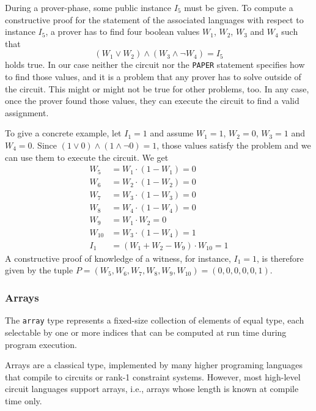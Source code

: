 \begin{example}
During a prover-phase, some public instance $I_5$ must be given. To compute a constructive proof for the statement of the associated languages with respect to instance $I_5$, a prover has to find four boolean values $W_1$, $W_2$, $W_3$ and $W_4$ such that 
$$
\left( W_1 \vee W_2 \right) \wedge (W_3 \wedge \lnot W_4) = I_5
$$ 
holds true. In our case neither the circuit nor the \texttt{PAPER} statement specifies how to find those values, and it is a problem that any prover has to solve outside of the circuit. This might or might not be true for other problems, too. In any case, once the prover found those values, they can execute the circuit to find a valid assignment. 

To give a concrete example, let $I_1=1$ and assume $W_1=1$, $W_2=0$, $W_3=1$ and $W_4=0$. Since 
$\left( 1 \vee 0 \right) \wedge (1 \wedge \lnot 0) = 1$, those values satisfy the problem and we can use them to execute the circuit. We get 
\begin{align*}
W_5 & = W_1 \cdot (1- W_1) = 0\\
W_6 & = W_2 \cdot (1- W_2) = 0 \\
W_7 & = W_3 \cdot (1- W_3) = 0 \\
W_8 & = W_4 \cdot (1- W_4) = 0 \\
W_9 & = W_1\cdot W_2 = 0\\
W_{10} & = W_3 \cdot (1-W_4) = 1\\
I_1 & = (W_1 + W_2 - W_9) \cdot W_{10} = 1
\end{align*}
A constructive proof of knowledge of a witness, for instance, $I_1=1$, is therefore given by the tuple $P=(W_5,W_6,W_7,W_8,W_9,W_{10})=(0,0,0,0,0,1)$. 
\end{example}
\subsubsection{Arrays} The \texttt{array} type represents a fixed-size collection of elements of equal type, each selectable by one or more indices that can be computed at run time during program execution. 

Arrays are a classical type, implemented by many higher programing languages that compile to circuits or rank-1 constraint systems. However, most high-level circuit languages support  arrays, i.e., arrays whose length is known at compile time only. 

